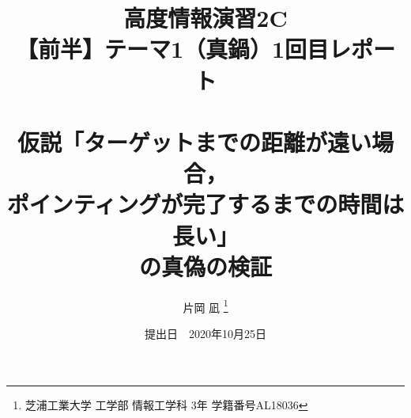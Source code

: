 \documentclass[a4paper, papersize, titlepage]{jsarticle}
\title{高度情報演習2C \\
【前半】テーマ1（真鍋）1回目レポート \\
~\\
仮説「ターゲットまでの距離が遠い場合，\\
ポインティングが完了するまでの時間は長い」\\
の真偽の検証
}
\author{片岡 凪 \thanks{芝浦工業大学 工学部 情報工学科 3年 学籍番号AL18036}}
\date{提出日　2020年10月25日}
\begin{document}
\maketitle
\setcounter{tocdepth}{3}
\tableofcontents

\newpage

\begin{multicols}{2}

\end{multicols}
\end{document}
